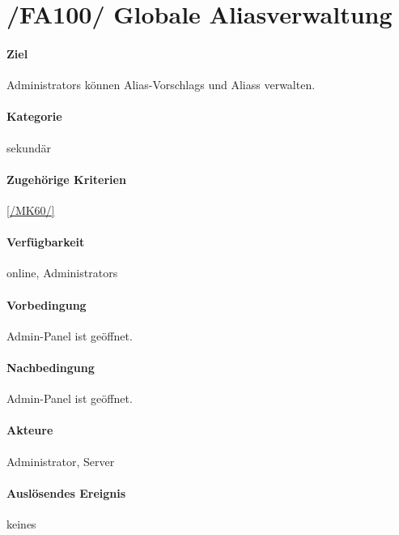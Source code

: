 \section[Globale Aliasverwaltung]{/FA100/ Globale Aliasverwaltung}
\label{/FA100/}
\paragraph{Ziel}
\Glspl{Administrator} können \Glspl{Alias-Vorschlag} und  \Glspl{Alias} verwalten.
\paragraph{Kategorie}
sekundär
\paragraph{Zugehörige Kriterien}
\ref{/MK60/}
\paragraph{Verfügbarkeit}
online, \Glspl{Administrator}
\paragraph{Vorbedingung}
\Gls{Admin-Panel} ist geöffnet.
\paragraph{Nachbedingung}
\Gls{Admin-Panel} ist geöffnet.
\paragraph{Akteure}
\Gls{Administrator}, \Gls{Server}
\paragraph{Auslösendes Ereignis}
keines
